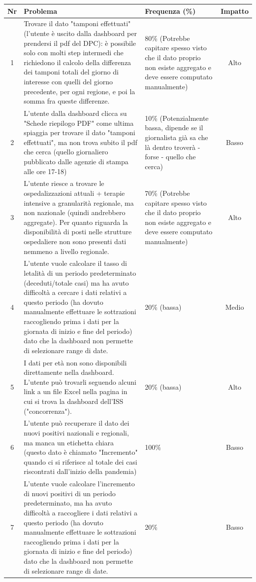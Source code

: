 \renewcommand{\arraystretch}{2}
\begin{longtable}{|c|p{7cm}|p{5cm}|c|}
    \hline
    \textbf{Nr} & \textbf{Problema} & \textbf{Frequenza (\%)} & \textbf{Impatto} \\
    \hline
    \endhead
    1 & Trovare il dato "tamponi effettuati" (l'utente è uscito dalla dashboard per prendersi il pdf del DPC): è possibile solo con molti step intermedi che richiedono il calcolo della differenza dei tamponi totali del giorno di interesse con quelli del giorno precedente, per ogni regione, e poi la somma fra queste differenze. & 80\% (Potrebbe capitare spesso visto che il dato proprio non esiste aggregato e deve essere computato manualmente) & Alto \\ \hline
    2 & L'utente dalla dashboard clicca su "Schede riepilogo PDF" come ultima spiaggia per trovare il dato "tamponi effettuati", ma non trova subito il pdf che cerca (quello giornaliero pubblicato dalle agenzie di stampa alle ore 17-18) & 10\% (Potenzialmente bassa, dipende se il giornalista già sa che là dentro troverà - forse - quello che cerca) & Basso \\ \hline
    3 & L'utente riesce a trovare le ospedalizzazioni attuali  + terapie intensive a granularità regionale, ma non nazionale (quindi andrebbero aggregate). Per quanto riguarda la disponibilità di posti nelle strutture ospedaliere non sono presenti dati nemmeno a livello regionale. & 70\% (Potrebbe capitare spesso visto che il dato proprio non esiste aggregato e deve essere computato manualmente) & Alto \\ \hline
    4 & L'utente vuole calcolare il tasso di letalità di un periodo predeterminato (deceduti/totale casi) ma ha avuto difficoltà a cercare i dati relativi a questo periodo (ha dovuto manualmente effettuare le sottrazioni raccogliendo prima i dati per la giornata di inizio e fine del periodo) dato che la dashboard non permette di selezionare range di date. & 20\% (bassa) & Medio \\ \hline
    5 & I dati per età non sono disponibili direttamente nella dashboard. L'utente può trovarli seguendo alcuni link a un file Excel nella pagina in cui si trova la dashboard dell'ISS ("concorrenza"). & 20\% (bassa) & Alto \\ \hline
    6 & L'utente può recuperare il dato dei nuovi positivi nazionali e regionali, ma manca un etichetta chiara (questo dato è chiamato "Incremento" quando ci si riferisce al totale dei casi riscontrati dall'inizio della pandemia) & 100\% & Basso \\ \hline
    7 & L'utente vuole calcolare l'incremento di nuovi positivi di un periodo predeterminato, ma ha avuto difficoltà a raccogliere i dati relativi a questo periodo (ha dovuto manualmente effettuare le sottrazioni raccogliendo prima i dati per la giornata di inizio e fine del periodo) dato che la dashboard non permette di selezionare range di date. & 20\% & Basso \\ \hline
\end{longtable}

